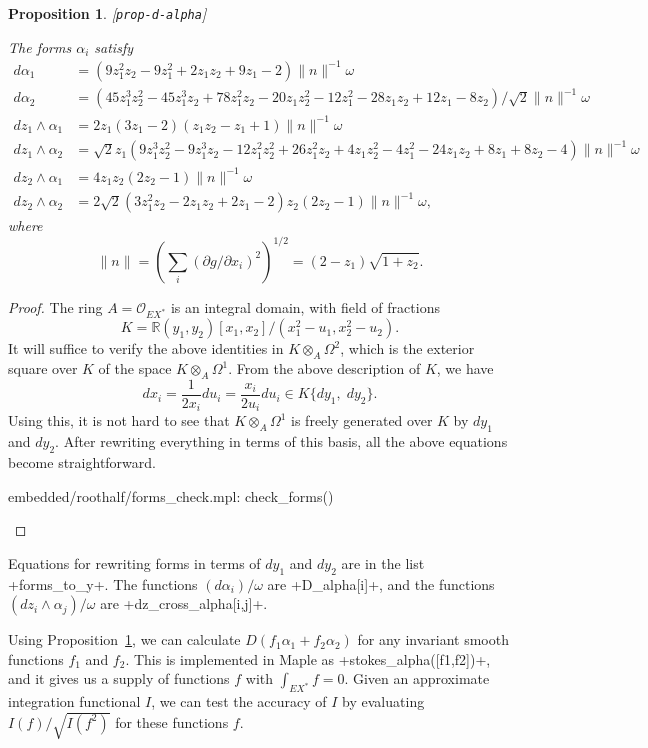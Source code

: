 \documentclass[reqno]{amsart}
\newcommand{\lbl}[1]{\label{#1}\textup{[\texttt{#1}]}\par}
\newcommand{\lbl}{\label}
\newcommand{\Om}        {\Omega}
\newcommand{\al}        {\alpha}
\newcommand{\om}        {\omega}
\newcommand{\R}         {{\mathbb{R}}}
\newcommand{\rt}        {\sqrt{2}}
\newcommand{\ot}        {\otimes}
\newcommand{\CO}        {\mathcal{O}}
\renewcommand{\:}{\colon}
\newtheorem{proposition}[theorem]{Proposition}
\theoremstyle{definition}
\begin{document}
\begin{proposition}\lbl{prop-d-alpha}
 The forms $\al_i$ satisfy
 \begin{align*}
  d\al_1 &= (9z_1^2 z_2-9 z_1^2+2z_1z_2+9z_1-2)\|n\|^{-1}\om \\
  d\al_2 &= (45 z_1^3 z_2^2-45 z_1^3 z_2+78 z_1^2 z_2-20 z_1 z_2^2
                -12 z_1^2-28 z_1 z_2+12 z_1-8 z_2)/\rt \|n\|^{-1}\om\\
  dz_1\wedge\al_1 &= 2 z_1 (3 z_1-2) (z_1 z_2-z_1+1)\|n\|^{-1}\om \\
  dz_1\wedge\al_2 &= \rt z_1
                        (9 z_1^3 z_2^2-9 z_1^3 z_2-12 z_1^2 z_2^2+
                         26 z_1^2 z_2+4 z_1 z_2^2-4 z_1^2-24 z_1 z_2+
                         8 z_1+8 z_2-4)\|n\|^{-1}\om \\
  dz_2\wedge\al_1 &= 4 z_1 z_2 (2 z_2-1)\|n\|^{-1}\om \\
  dz_2\wedge\al_2 &= 2 \rt (3 z_1^2 z_2-2 z_1 z_2+2 z_1-2) z_2 (2 z_2-1)\|n\|^{-1}\om,
 \end{align*}
 where
 \[ \|n\|=\left(\sum_i(\partial g/\partial x_i)^2\right)^{1/2} =
      (2-z_1)\sqrt{1+z_2}.
 \]
\end{proposition}
\begin{proof}
 The ring $A=\CO_{EX^*}$ is an integral domain, with field of fractions
 \[ K = \R(y_1,y_2)[x_1,x_2]/(x_1^2-u_1,x_2^2-u_2). \]
 It will suffice to verify the above identities in $K\ot_A\Om^2$,
 which is the exterior square over $K$ of the space $K\ot_A\Om^1$.
 From the above description of $K$, we have
 \[ dx_i = \frac{1}{2x_i} du_i = \frac{x_i}{2u_i} du_i \in
      K\{dy_1,\;dy_2\}.
 \]
 Using this, it is not hard to see that $K\ot_A\Om^1$ is freely
 generated over $K$ by $dy_1$ and $dy_2$.  After rewriting everything
 in terms of this basis, all the above equations become
 straightforward.
 \begin{checks}
  embedded/roothalf/forms_check.mpl: check_forms()
 \end{checks}
\end{proof}
Equations for rewriting forms in terms of $dy_1$ and $dy_2$ are in the
list \mcode+forms_to_y+.  The functions $(d\al_i)/\om$ are
\mcode+D_alpha[i]+, and the functions $(dz_i\wedge\al_j)/\om$ are
\mcode+dz_cross_alpha[i,j]+.

Using Proposition~\ref{prop-d-alpha}, we can calculate
$D(f_1\al_1+f_2\al_2)$ for any invariant smooth functions $f_1$ and
$f_2$.  This is implemented in Maple as
\mcode+stokes_alpha([f1,f2])+, and it gives us a supply of functions $f$ with
$\int_{EX^*}f=0$.  Given an approximate integration functional $I$, we
can test the accuracy of $I$ by evaluating $I(f)/\sqrt{I(f^2)}$ for
these functions $f$.
\end{document}
